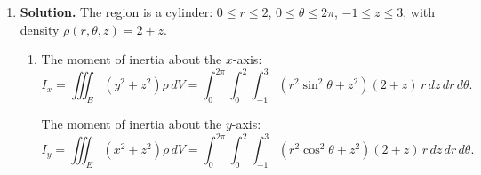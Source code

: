 \begin{enumerate}
\begin{enumerate}
$= \frac{xb^3}{3}+b^4\left(\frac{5}{8}-\frac{5}{6}+\frac{5}{16}\right) = \frac{xb^3}{3}+5b^4\left(\frac{1}{8}-\frac{1}{6}+\frac{1}{16}\right)$.

$= \frac{xb^3}{3}+5b^4\cdot\frac{6-8+3}{48} = \frac{xb^3}{3}+\frac{5b^4}{48}$.

Multiply by $1/18$: $\frac{xb^3}{54}+\frac{5b^4}{864}$.

Second part: $\frac{1}{81}\int_0^{b/2}(b-2y)^3\,dy$. Let $t=b-2y$:
$= \frac{1}{81}\cdot\frac{1}{2}\int_0^b t^3\,dt = \frac{1}{162}\cdot\frac{b^4}{4} = \frac{b^4}{648}$.

Middle integral $= \frac{xb^3}{54}+\frac{5b^4}{864}+\frac{b^4}{648}$.

$\frac{5}{864}+\frac{1}{648}$: LCD = 2592. $\frac{15}{2592}+\frac{4}{2592} = \frac{19}{2592}$.

$= \frac{xb^3}{54}+\frac{19b^4}{2592}$.

Outer ($x$), $b=6-x$, $u=6-x$:
$\int_0^6\left[\frac{(6-u)u^3}{54}+\frac{19u^4}{2592}\right]du$.

$= \frac{1}{54}\int_0^6(6u^3-u^4)\,du+\frac{19}{2592}\int_0^6 u^4\,du$.

$= \frac{1}{54}\left(1944-\frac{7776}{5}\right)+\frac{19}{2592}\cdot\frac{7776}{5}$.

Note $\frac{1}{54}\cdot\frac{1944}{5} = \frac{36}{5}$ and $\frac{19\cdot 7776}{2592\cdot 5} = \frac{19\cdot 3}{5} = \frac{57}{5}$, so the sum is $\frac{36}{5}+\frac{57}{5} = \frac{93}{5}$.

$\iiint z\rho\,dV = \frac{36+57}{5} = \frac{93}{5}$.

$\bar{z} = \frac{93/5}{87/2} = \frac{93\cdot 2}{5\cdot 87} = \frac{186}{435} = \frac{62}{145}$.

Therefore:
\[
\boxed{M = \frac{87}{2}, \quad (\bar{x},\bar{y},\bar{z}) = \left(\frac{246}{145},\;\frac{132}{145},\;\frac{62}{145}\right)}.
\]
\end{enumerate}

\item \textbf{Solution.}
The region is a cylinder: $0\le r\le 2$, $0\le\theta\le 2\pi$, $-1\le z\le 3$, with density $\rho(r,\theta,z) = 2+z$.

\begin{enumerate}
\item The moment of inertia about the $x$-axis:
\[
I_x = \iiint_E(y^2+z^2)\rho\,dV = \int_0^{2\pi}\int_0^2\int_{-1}^3(r^2\sin^2\theta+z^2)(2+z)\,r\,dz\,dr\,d\theta.
\]

The moment of inertia about the $y$-axis:
\[
I_y = \iiint_E(x^2+z^2)\rho\,dV = \int_0^{2\pi}\int_0^2\int_{-1}^3(r^2\cos^2\theta+z^2)(2+z)\,r\,dz\,dr\,d\theta.
\]


\end{enumerate}
\end{enumerate}

